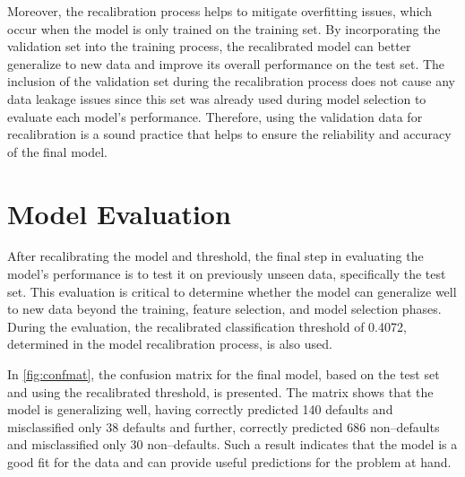 Moreover, the recalibration process helps to mitigate overfitting issues, which occur when the model is only trained on the training set.
By incorporating the validation set into the training process, the recalibrated model can better generalize to new data and improve its overall performance on the test set.
The inclusion of the validation set during the recalibration process does not cause any data leakage issues since this set was already used during model selection to evaluate each model's performance.
Therefore, using the validation data for recalibration is a sound practice that helps to ensure the reliability and accuracy of the final model.

\section{Model Evaluation}

After recalibrating the model and threshold, the final step in evaluating the model's performance is to test it on previously unseen data, specifically the test set.
This evaluation is critical to determine whether the model can generalize well to new data beyond the training, feature selection, and model selection phases.
During the evaluation, the recalibrated classification threshold of 0.4072, determined in the model recalibration process, is also used.

In \autoref{fig:confmat}, the confusion matrix for the final model, based on the test set and using the recalibrated threshold, is presented. The matrix shows that the model is generalizing well, having correctly predicted 140 defaults and misclassified only 38 defaults and further, correctly predicted 686 non--defaults and misclassified only 30 non--defaults. Such a result indicates that the model is a good fit for the data and can provide useful predictions for the problem at hand.

